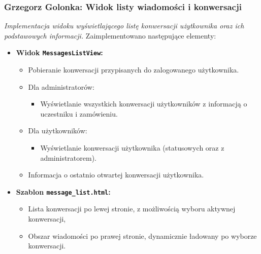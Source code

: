 \documentclass[12pt,a4paper,oneside]{article}
\theoremstyle{definition}
\numberwithin{equation}{section}
\begin{document}
\subsubsection{Grzegorz Golonka: Widok listy wiadomości i konwersacji}
\label{section:1.3.30}
\textit{
Implementacja widoku wyświetlającego listę konwersacji użytkownika oraz ich podstawowych informacji.
}
Zaimplementowano następujące elementy:
\begin{itemize}
    \item \textbf{Widok \texttt{MessagesListView}:}
    \begin{itemize}
        \item Pobieranie konwersacji przypisanych do zalogowanego użytkownika.
        \item Dla administratorów:
        \begin{itemize}
            \item Wyświetlanie wszystkich konwersacji użytkowników z informacją o uczestniku i zamówieniu.
        \end{itemize}
        \item Dla użytkowników:
        \begin{itemize}
            \item Wyświetlanie konwersacji użytkownika (statusowych oraz z administratorem).
        \end{itemize}
        \item Informacja o ostatnio otwartej konwersacji użytkownika.
    \end{itemize}
    \item \textbf{Szablon \texttt{message\_list.html}:}
    \begin{itemize}
        \item Lista konwersacji po lewej stronie, z możliwością wyboru aktywnej konwersacji,
        \item Obszar wiadomości po prawej stronie, dynamicznie ładowany po wyborze konwersacji.
    \end{itemize}
\end{itemize}
% 
%
\end{document}
